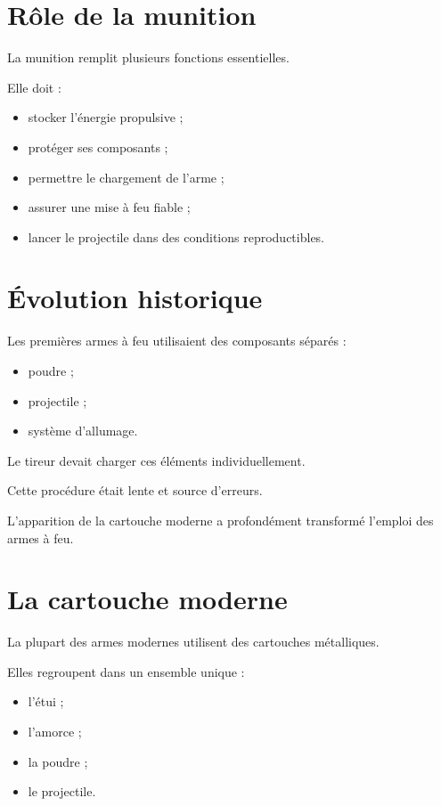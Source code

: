 \section{Rôle de la munition}

La munition remplit plusieurs fonctions essentielles.

Elle doit :

\begin{itemize}
    \item stocker l'énergie propulsive ;
    \item protéger ses composants ;
    \item permettre le chargement de l'arme ;
    \item assurer une mise à feu fiable ;
    \item lancer le projectile dans des conditions reproductibles.
\end{itemize}

\section{Évolution historique}

Les premières armes à feu utilisaient des composants séparés :

\begin{itemize}
    \item poudre ;
    \item projectile ;
    \item système d'allumage.
\end{itemize}

Le tireur devait charger ces éléments individuellement.

Cette procédure était lente et source d'erreurs.

L'apparition de la cartouche moderne a profondément transformé l'emploi des
armes à feu.

\section{La cartouche moderne}

La plupart des armes modernes utilisent des cartouches métalliques.

Elles regroupent dans un ensemble unique :

\begin{itemize}
    \item l'étui ;
    \item l'amorce ;
    \item la poudre ;
    \item le projectile.
\end{itemize}

